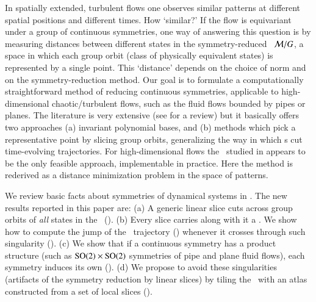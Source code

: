 

In spatially extended, turbulent flows one observes similar patterns at
different spatial positions and different times. How `similar?' If the
flow is equivariant under a group of continuous symmetries, one way of
answering this question is by measuring distances between different
states in the symmetry-reduced \statesp\ ${\cal M}/G$, a space in which
each group orbit (class of physically equivalent states) is represented
by a single point. This `distance' depends on the choice of norm and on
the symmetry-reduction method. Our goal is to formulate a computationally
straightforward method of reducing continuous symmetries, applicable to
high-dimensional chaotic/turbulent flows, such as the fluid flows bounded
by pipes or planes. The literature is very extensive (see
 for a review) but it basically offers two
approaches (a) invariant polynomial bases, and (b) methods which pick a
representative point by slicing group orbits, generalizing the way in
which {\PoincSec}s cut time-evolving trajectories. For high-dimensional
flows the \mslices\ studied in 
appears to be the only feasible approach, implementable in practice. Here
the method is rederived as a distance minimization problem in the space
of patterns.

We review basic facts
about symmetries of dynamical systems in .
The new results reported in this paper are:
    (a) A generic linear slice cuts across group orbits of {\em all}
        states in the \statesp\ ().
    (b) Every slice carries along with it a {\sset}. We show how to
        compute the jump of the \reducedsp\ trajectory
         () whenever it crosses
        through such singularity  ().
	(c) We show that if a continuous symmetry has a product structure
		(such as $\textrm{SO}(2) \times \textrm{SO}(2)$ symmetries of pipe and plane
		fluid flows), each symmetry induces its own {\sset}
		().
    (d) We propose to avoid these singularities (artifacts of the symmetry
        reduction by linear slices) by tiling the \statesp\ with an atlas
        constructed from a set of local slices  ().

